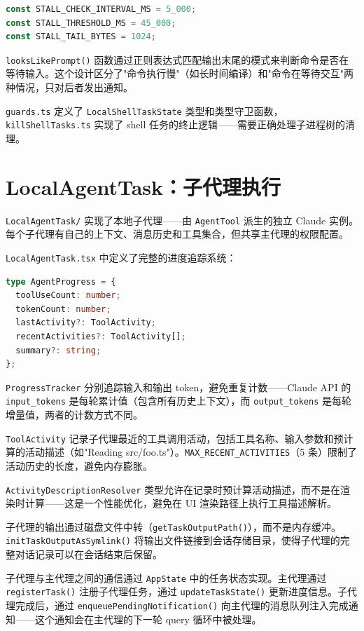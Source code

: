 \begin{lstlisting}[language=TypeScript]
const STALL_CHECK_INTERVAL_MS = 5_000;
const STALL_THRESHOLD_MS = 45_000;
const STALL_TAIL_BYTES = 1024;
\end{lstlisting}

\texttt{looksLikePrompt()} 函数通过正则表达式匹配输出末尾的模式来判断命令是否在等待输入。这个设计区分了"命令执行慢"（如长时间编译）和"命令在等待交互"两种情况，只对后者发出通知。

\texttt{guards.ts} 定义了 \texttt{LocalShellTaskState} 类型和类型守卫函数，\texttt{killShellTasks.ts} 实现了 shell 任务的终止逻辑——需要正确处理子进程树的清理。

\section{LocalAgentTask：子代理执行}

\texttt{LocalAgentTask/} 实现了本地子代理——由 \texttt{AgentTool} 派生的独立 Claude 实例。每个子代理有自己的上下文、消息历史和工具集合，但共享主代理的权限配置。

\texttt{LocalAgentTask.tsx} 中定义了完整的进度追踪系统：

\begin{lstlisting}[language=TypeScript]
type AgentProgress = {
  toolUseCount: number;
  tokenCount: number;
  lastActivity?: ToolActivity;
  recentActivities?: ToolActivity[];
  summary?: string;
};
\end{lstlisting}

\texttt{ProgressTracker} 分别追踪输入和输出 token，避免重复计数——Claude API 的 \texttt{input\_tokens} 是每轮累计值（包含所有历史上下文），而 \texttt{output\_tokens} 是每轮增量值，两者的计数方式不同。

\texttt{ToolActivity} 记录子代理最近的工具调用活动，包括工具名称、输入参数和预计算的活动描述（如"Reading src/foo.ts"）。\texttt{MAX\_RECENT\_ACTIVITIES}（5 条）限制了活动历史的长度，避免内存膨胀。

\texttt{ActivityDescriptionResolver} 类型允许在记录时预计算活动描述，而不是在渲染时计算——这是一个性能优化，避免在 UI 渲染路径上执行工具描述解析。

子代理的输出通过磁盘文件中转（\texttt{getTaskOutputPath()}），而不是内存缓冲。\texttt{initTaskOutputAsSymlink()} 将输出文件链接到会话存储目录，使得子代理的完整对话记录可以在会话结束后保留。

子代理与主代理之间的通信通过 \texttt{AppState} 中的任务状态实现。主代理通过 \texttt{registerTask()} 注册子代理任务，通过 \texttt{updateTaskState()} 更新进度信息。子代理完成后，通过 \texttt{enqueuePendingNotification()} 向主代理的消息队列注入完成通知——这个通知会在主代理的下一轮 query 循环中被处理。


